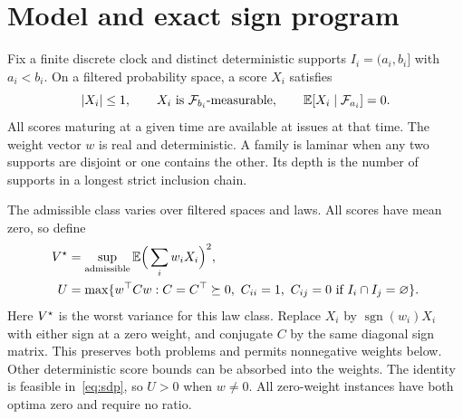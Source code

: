 \section{Model and exact sign program}

\begin{definition}\label{def:model}
Fix a finite discrete clock and distinct deterministic supports
$I_i=(a_i,b_i]$ with $a_i<b_i$. On a filtered probability space,
a score $X_i$ satisfies
\[
 |X_i|\le 1,\qquad X_i\text{ is }\mathcal F_{b_i}\text{-measurable},
 \qquad \mathbb E[X_i\mid\mathcal F_{a_i}]=0.
\]
All scores maturing at a given time are available at issues at that time.
The weight vector $w$ is real and deterministic. A family is laminar
when any two supports are disjoint or one contains the other. Its depth
is the number of supports in a longest strict inclusion chain.
\end{definition}

The admissible class varies over filtered spaces and laws. All scores
have mean zero, so define
\begin{align}
 V^\star &= \sup_{\rm admissible}\mathbb E\Big(\sum_i w_i X_i\Big)^2,\\
 U &= \max\{w^\top Cw : C=C^\top\succeq0,\ C_{ii}=1,\
           C_{ij}=0\text{ if } I_i\cap I_j=\varnothing\}.\label{eq:sdp}
\end{align}
Here $V^\star$ is the worst variance for this law class. Replace $X_i$ by
$\operatorname{sgn}(w_i)X_i$ with either sign at a zero weight, and
conjugate $C$ by the same diagonal sign matrix. This preserves both
problems and permits nonnegative weights below. Other deterministic
score bounds can be absorbed into the weights. The identity is feasible
in~\eqref{eq:sdp}, so $U>0$ when $w\ne0$. All zero-weight instances
have both optima zero and require no ratio.

